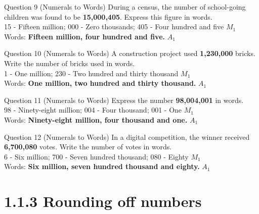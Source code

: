 \documentclass[12pt, a4paper, oneside]{article}
\begin{document}
\begin{solvingbox}{Question 9 (Numerals to Words)}
During a census, the number of school-going children was found to be \textbf{15,000,405}. Express this figure in words. \\
15 - Fifteen million; 000 - Zero thousands; 405 - Four hundred and five \hfill $M_1$ \\
Words: \textbf{Fifteen million, four hundred and five.} \hfill $A_1$
\end{solvingbox}

\begin{solvingbox}{Question 10 (Numerals to Words)}
A construction project used \textbf{1,230,000} bricks. Write the number of bricks used in words. \\
1 - One million; 230 - Two hundred and thirty thousand \hfill $M_1$ \\
Words: \textbf{One million, two hundred and thirty thousand.} \hfill $A_1$
\end{solvingbox}

\begin{solvingbox}{Question 11 (Numerals to Words)}
Express the number \textbf{98,004,001} in words. \\
98 - Ninety-eight million; 004 - Four thousand; 001 - One \hfill $M_1$ \\
Words: \textbf{Ninety-eight million, four thousand and one.} \hfill $A_1$
\end{solvingbox}

\begin{solvingbox}{Question 12 (Numerals to Words)}
In a digital competition, the winner received \textbf{6,700,080} votes. Write the number of votes in words. \\
6 - Six million; 700 - Seven hundred thousand; 080 - Eighty \hfill $M_1$ \\
Words: \textbf{Six million, seven hundred thousand and eighty.} \hfill $A_1$
\end{solvingbox}

\section*{1.1.3 Rounding off numbers}
\end{document}
